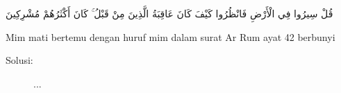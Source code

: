 \item
\begin{center}
{\arabic  قُلْ سِيرُوا فِي الْأَرْضِ فَانْظُرُوا كَيْفَ كَانَ عَاقِبَةُ الَّذِينَ مِنْ قَبْلُ ۚ كَانَ أَكْثَرُهُمْ مُشْرِكِينَ } \par
\end{center}
Mim mati bertemu dengan huruf mim dalam  surat Ar Rum ayat 42 berbunyi
\begin{description}
    \item[Solusi:]
        ...
\end{description}

